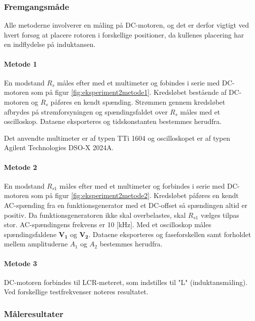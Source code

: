 \subsubsection{Fremgangsmåde}
Alle metoderne involverer en måling på DC-motoren, og det er derfor vigtigt ved hvert forsøg at placere
rotoren i forskellige positioner, da kullenes placering har en indflydelse på induktansen.
\paragraph{Metode 1\\}
En modstand \(R_s\) måles efter med et multimeter og fobindes i serie med DC-motoren
som på figur \ref{fig:eksperiment2metode1}.
Kredsløbet bestående af DC-motoren og \(R_s\) påføres en kendt spænding.
Strømmen gennem kredsløbet afbrydes på strømforsyningen og spændingsfaldet
over \(R_s\) måles med et oscilloskop.
Dataene eksporteres og tidskonstanten bestemmes herudfra.

Det anvendte multimeter er af typen TTi 1604 og oscilloskopet er af typen Agilent Technologies DSO-X 2024A.

\paragraph{Metode 2\\}
En modstand \(R_{s1}\) måles efter med et multimeter og forbindes i serie med DC-motoren
som på figur \ref{fig:eksperiment2metode2}.
Kredsløbet påføres en kendt AC-spænding fra en funktionsgenerator med et DC-offset så spændingen
altid er positiv.
Da funktionsgeneratoren ikke skal overbelastes, skal \(R_{s1}\) vælges tilpas stor.
AC-spændingens frekvens er 10 [kHz].
Med et oscilloskop måles spændingsfaldene \(\mathbf{V_1}\) og \(\mathbf{V_2}\).
Dataene eksporteres og faseforskellen samt forholdet mellem amplituderne \(A_1\) og \(A_2\) bestemmes herudfra.

\paragraph{Metode 3\\}
DC-motoren forbindes til LCR-meteret, som indstilles til "L" (induktansmåling).
Ved forskellige testfrekvenser noteres resultatet.

\subsubsection{Måleresultater}
